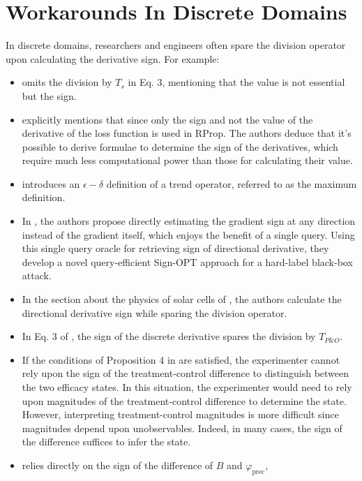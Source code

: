 \documentclass[11pt]{book}
\begin{document}
\section{Workarounds In Discrete Domains}

In discrete domains, researchers and engineers often spare the division
operator upon calculating the derivative sign. For example:
\begin{itemize}
\item \cite{schwartzlecture} omits the division by $T_{s}$ in Eq.
3, mentioning that the value is not essential but the sign.
\item \cite{valishevsky2002adaptive} explicitly
mentions that since only the sign and not the value of the derivative
of the loss function is used in RProp. The authors deduce that it's
possible to derive formulae to determine the sign of the derivatives,
which require much less computational power than those for calculating
their value.
\item \cite{guan2012detection} introduces
an $\epsilon-\delta$ definition of a \textquotedbl trend operator,\textquotedbl{}
referred to as the maximum definition.
\item In \cite{cheng2019sign},
the authors propose directly estimating the gradient sign at any direction
instead of the gradient itself, which enjoys the benefit of a single
query. Using this single query oracle for retrieving sign of directional
derivative, they develop a novel query-efficient Sign-OPT approach
for a hard-label black-box attack.
\item In the section about the physics of solar cells of \cite{de2016analysis},
the authors calculate the directional derivative sign while sparing
the division operator.
\item In Eq. 3 of \cite{costanzo2019novel},
the sign of the discrete derivative spares the division by $T_{P\&O}$.
\item If the conditions of Proposition 4 in \cite{chemla2019controls}
are satisfied, the experimenter cannot rely upon the sign of the treatment-control
difference to distinguish between the two efficacy states. In this
situation, the experimenter would need to rely upon magnitudes of
the treatment-control difference to determine the state. However,
interpreting treatment-control magnitudes is more difficult since
magnitudes depend upon unobservables. Indeed, in many cases, the sign
of the difference suffices to infer the state.
\item \cite{li2020field}
relies directly on the sign of the difference of $B$ and $\varphi_{\text{prec}}$,

\end{itemize}
\end{document}
